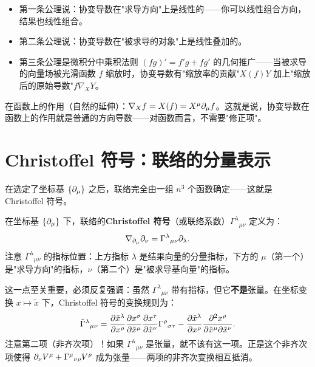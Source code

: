 \begin{remark}[公理的物理直觉]
\begin{itemize}
    \item 第一条公理说：协变导数在"求导方向"上是线性的——你可以线性组合方向，结果也线性组合。
    \item 第二条公理说：协变导数在"被求导的对象"上是线性叠加的。
    \item 第三条公理是微积分中乘积法则 $(fg)' = f'g + fg'$ 的几何推广——当被求导的向量场被光滑函数 $f$ 缩放时，协变导数有"缩放率的贡献"$X(f)Y$ 加上"缩放后的原始导数"$f\nabla_X Y$。
\end{itemize}
\end{remark}

在函数上的作用（自然的延伸）：$\nabla_X f = X(f) = X^\mu \partial_\mu f$。这就是说，协变导数在函数上的作用就是普通的方向导数——对函数而言，不需要"修正项"。

\section{Christoffel 符号：联络的分量表示}

在选定了坐标基 $\{\partial_\mu\}$ 之后，联络完全由一组 $n^3$ 个函数确定——这就是 Christoffel 符号。

\begin{definition}[Christoffel 符号]
在坐标基 $\{\partial_\mu\}$ 下，联络的\textbf{Christoffel 符号}（或联络系数）$\Gamma^\lambda{}_{\mu\nu}$ 定义为：
\begin{equation}
    \nabla_{\partial_\mu} \partial_\nu = \Gamma^\lambda{}_{\mu\nu} \partial_\lambda.
\end{equation}
注意 $\Gamma^\lambda{}_{\mu\nu}$ 的指标位置：上方指标 $\lambda$ 是结果向量的分量指标，下方的 $\mu$（第一个）是"求导方向"的指标，$\nu$（第二个）是"被求导基向量"的指标。
\end{definition}

\begin{remark}
这一点至关重要，必须反复强调：虽然 $\Gamma^\lambda{}_{\mu\nu}$ 带有指标，但它\textbf{不是}张量。在坐标变换 $x \mapsto \tilde{x}$ 下，Christoffel 符号的变换规则为：
\begin{equation}
    \tilde{\Gamma}^\lambda{}_{\mu\nu} = \frac{\partial \tilde{x}^\lambda}{\partial x^\rho} \frac{\partial x^\sigma}{\partial \tilde{x}^\mu} \frac{\partial x^\tau}{\partial \tilde{x}^\nu} \Gamma^\rho{}_{\sigma\tau}
    - \frac{\partial \tilde{x}^\lambda}{\partial x^\rho} \frac{\partial^2 x^\rho}{\partial \tilde{x}^\mu \partial \tilde{x}^\nu}.
\end{equation}
注意第二项（非齐次项）！如果 $\Gamma^\lambda{}_{\mu\nu}$ 是张量，就不该有这一项。正是这个非齐次项使得 $\partial_\nu V^\mu + \Gamma^\mu{}_{\nu\rho} V^\rho$ 成为张量——两项的非齐次变换相互抵消。
\end{remark}

